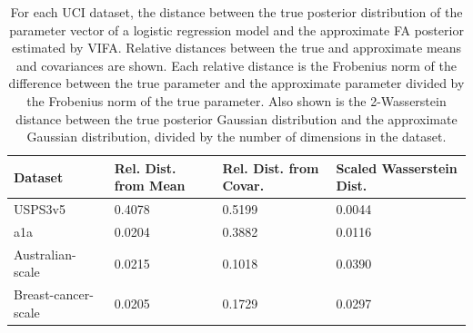 \documentclass[10pt]{article} %
\begin{document}
\begin{table}[!h]
\caption{For each UCI dataset, the distance between the true posterior distribution of the parameter vector of a logistic regression model and the approximate FA posterior estimated by VIFA. Relative distances between the true and approximate means and covariances are shown. Each relative distance is the Frobenius norm of the difference between the true parameter and the approximate parameter divided by the Frobenius norm of the true parameter. Also shown is the 2-Wasserstein distance between the true posterior Gaussian distribution and the approximate Gaussian distribution, divided by the number of dimensions in the dataset.}
\label{table:logistic_regression_vi_posterior_uci}
\begin{center}
\begin{tabular}{l|lll}
\textbf{Dataset}    & \textbf{Rel. Dist. from Mean} & \textbf{Rel. Dist. from Covar.} & \textbf{Scaled Wasserstein Dist.} \\ \hline
USPS3v5             & 0.4078                        & 0.5199                          & 0.0044                            \\
a1a                 & 0.0204                        & 0.3882                          & 0.0116                            \\
Australian-scale    & 0.0215                        & 0.1018                          & 0.0390                            \\
Breast-cancer-scale & 0.0205                        & 0.1729                          & 0.0297                           
\end{tabular}
\end{center}
\end{table}
\end{document}
